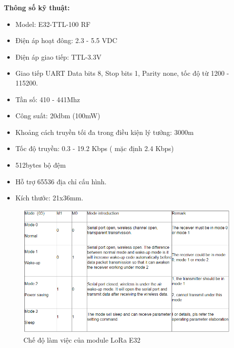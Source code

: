 \indent \textbf{Thông số kỹ thuật:}
\begin{itemize}
	\item Model: E32-TTL-100 RF
	\item Điện áp hoạt đông: 2.3 - 5.5 VDC
	\item Điện áp giao tiếp: TTL-3.3V
	\item Giao tiếp UART Data bits 8, Stop bits 1, Parity none, tốc độ từ 1200 - 115200.
	\item Tần số: 410 - 441Mhz
	\item Công suất: 20dbm (100mW)
	\item Khoảng cách truyền tối đa trong điều kiện lý tưởng: 3000m
	\item Tốc độ truyền: 0.3 - 19.2 Kbps ( mặc định 2.4 Kbps)
	\item 512bytes bộ đệm
	\item Hỗ trợ 65536 địa chỉ cấu hình.
	\item Kích thước: 21x36mm.
\end{itemize}
\begin{figure}[H]
	\centering
	\includegraphics[scale=.5]{Chapter 2/image chapter 2/workmodeE32.png}
	\caption[Chế độ làm việc của module LoRa E32]{Chế độ làm việc của module LoRa E32}
	\label{hinh37}
\end{figure}
